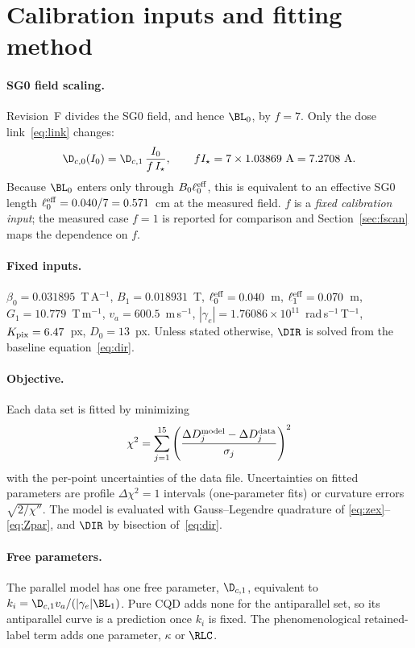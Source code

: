 \section{Calibration inputs and fitting method}
\label{sec:method}

\paragraph{SG0 field scaling.} Revision~F divides the SG0 field, and hence $\BL_0$, by $f=7$. Only the
dose link~\eqref{eq:link} changes:
\begin{equation}
\D_{c,0}(I_0)=\D_{c,1}\,\frac{I_0}{f\,I_\star},\qquad fI_\star=7\times1.03869~\text{A}=7.2708~\text{A}.
\end{equation}
Because $\BL_0$ enters only through $B_0\ell_0^{\rm eff}$, this is equivalent to an effective SG0 length
$\ell_0^{\rm eff}=0.040/7=0.571$~cm at the measured field. $f$ is a \emph{fixed calibration input}; the
measured case $f=1$ is reported for comparison and Section~\ref{sec:fscan} maps the dependence on $f$.

\paragraph{Fixed inputs.} $\beta_0=0.031895$~T\,A$^{-1}$, $B_1=0.018931$~T, $\ell_0^{\rm eff}=0.040$~m,
$\ell_1^{\rm eff}=0.070$~m, $G_1=10.779$~T\,m$^{-1}$, $v_a=600.5$~m\,s$^{-1}$,
$|\gamma_e|=1.76086\times10^{11}$~rad\,s$^{-1}$\,T$^{-1}$, $K_{\rm pix}=6.47$~px, $D_0=13$~px. Unless
stated otherwise, $\DIR$ is solved from the baseline equation~\eqref{eq:dir}.

\paragraph{Objective.} Each data set is fitted by minimizing
\begin{equation}
\chi^2=\sum_{j=1}^{15}\left(\frac{\Delta D_j^{\rm model}-\Delta D_j^{\rm data}}{\sigma_j}\right)^2
\end{equation}
with the per-point uncertainties of the data file. Uncertainties on fitted parameters are profile
$\Delta\chi^2=1$ intervals (one-parameter fits) or curvature errors $\sqrt{2/\chi''}$. The model is
evaluated with Gauss--Legendre quadrature of \eqref{eq:zex}--\eqref{eq:Zpar}, and $\DIR$ by bisection
of~\eqref{eq:dir}.

\paragraph{Free parameters.} The parallel model has one free parameter, $\D_{c,1}$, equivalent to
$k_i=\D_{c,1}v_a/(|\gamma_e|\BL_1)$. Pure CQD adds none for the antiparallel set, so its antiparallel
curve is a prediction once $k_i$ is fixed. The phenomenological retained-label term adds one
parameter, $\kappa$ or $\RLC$.

